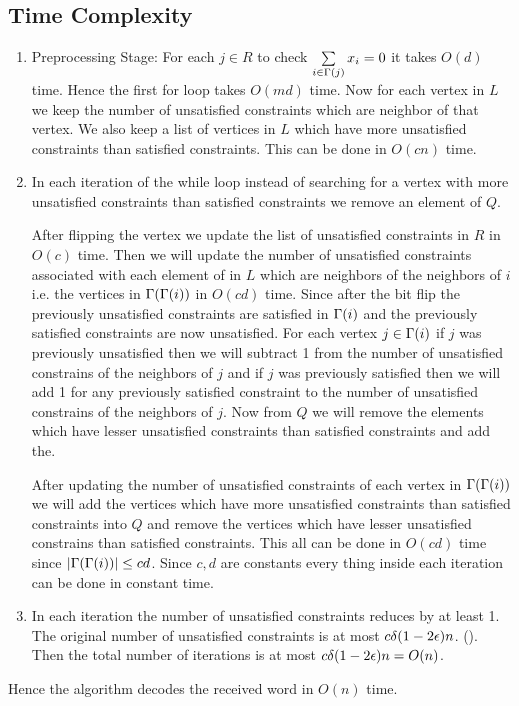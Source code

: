 \subsection{Time Complexity}
\begin{enumerate}
	\item Preprocessing Stage: For each $j\in R$ to check $\sum\limits_{i\in \Gamma(j)}x_i=0$ it takes $O(d)$ time. Hence the first for loop takes $O(md)$ time. Now for each vertex in $L$ we keep the number of unsatisfied constraints which are neighbor of that vertex. We also keep a list of vertices in $L$ which have more unsatisfied constraints than satisfied constraints. This can be done in $O(cn)$ time.
	\item In each iteration of the while loop instead of searching for a vertex with more unsatisfied constraints than satisfied constraints we remove an element of $Q$. \parinn
	
	After flipping the vertex we update the list of unsatisfied constraints in $R$ in $O(c)$ time. Then we  will update the number of unsatisfied constraints associated with each element of in $L$ which are neighbors of the neighbors of $i$ i.e. the vertices in  $\Gamma(\Gamma(i))$ in $O(cd)$ time. Since after the bit flip the previously unsatisfied constraints are satisfied in $\Gamma(i)$ and the previously satisfied constraints are now unsatisfied. For each vertex $j\in\Gamma(i)$ if $j$ was previously unsatisfied then we will subtract 1 from the number of unsatisfied constrains of the neighbors of $j$ and if $j$ was previously satisfied then we will add 1 for any previously satisfied constraint to the number of unsatisfied constrains of the neighbors of $j$. Now from $Q$ we will remove the elements which have lesser unsatisfied constraints than satisfied constraints and add the.
	
	After updating the number of unsatisfied constraints of each vertex in $\Gamma(\Gamma(i))$ we will add the vertices which have more unsatisfied constraints than satisfied constraints into $Q$ and remove the vertices which have lesser unsatisfied constrains than satisfied constraints. This all can be done in $O(cd)$ time since $|\Gamma(\Gamma(i))|\leq cd$. Since $c,d$ are constants every thing inside each iteration can be done in constant time.
	\item In each iteration the number of unsatisfied constraints reduces by at least 1. The original number of unsatisfied constraints is at most $c\delta (1-2\epsilon)n$. (). Then the total number of iterations is at most $c\delta(1-2\epsilon)n=O(n)$.
\end{enumerate}
Hence the algorithm decodes the received word in $O(n)$ time.